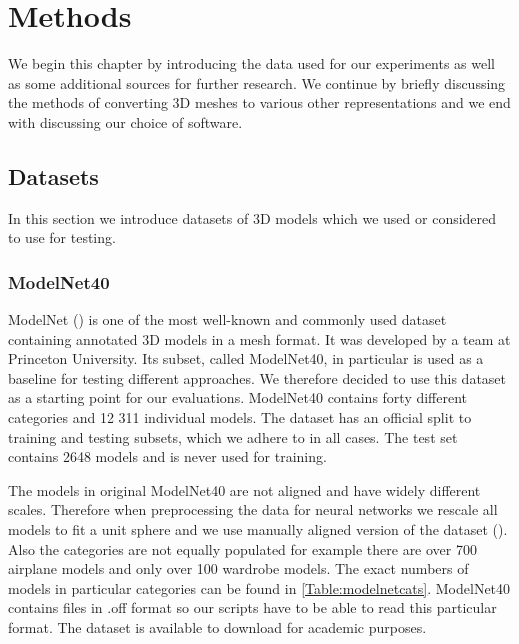 \chapter{Methods}
\label{sec:chap4}
We begin this chapter by introducing the data used for our experiments as well as some additional sources for further research. We continue by briefly discussing the methods of converting 3D meshes to various other representations and we end with discussing our choice of software.

\section{Datasets}
\label{sec:dataset}
In this section we introduce datasets of 3D models which we used or considered to use for testing.

\subsection{ModelNet40}
\label{sec:modelnet}
ModelNet (\cite{wu_3d_2014}) is one of the most well-known and commonly used dataset containing annotated 3D models in a mesh format. It was developed by a team at Princeton University. Its subset, called ModelNet40, in particular is used as a baseline for testing different approaches. We therefore decided to use this dataset as a starting point for our evaluations. ModelNet40 contains forty different categories and 12 311 individual models. The dataset has an official split to training and testing subsets, which we adhere to in all cases. The test set contains 2648 models and is never used for training. \par



The models in original ModelNet40 are not aligned and have widely different scales. Therefore when preprocessing the data for neural networks we rescale all models to fit a  unit sphere and we use manually aligned version of the dataset (\cite{sedaghat_orientation-boosted_2016}). Also the categories are not equally populated for example there are over 700 airplane models and only over 100 wardrobe models. The exact numbers of models in particular categories can be found in \autoref{Table:modelnetcats}. ModelNet40 contains files in .off format so our scripts have to be able to read this particular format. The dataset is available to download for academic purposes.




